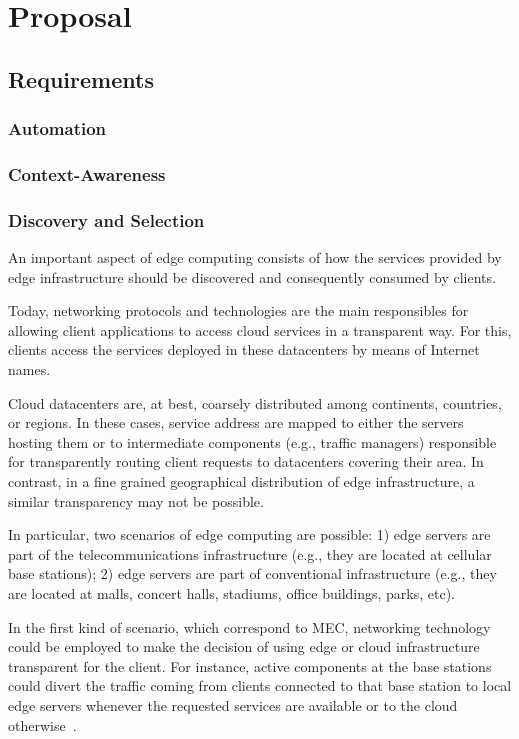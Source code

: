 \section{Proposal}\label{sec:proposal}

\subsection{Requirements}

\subsubsection{Automation}



\subsubsection{Context-Awareness}



\subsubsection{Discovery and Selection }

An important aspect of edge computing consists of how the services provided by edge infrastructure should be discovered and consequently consumed by clients. 

Today, networking protocols and technologies are the main responsibles for allowing client applications to access cloud services in a transparent way. For this, clients access the services deployed in these datacenters by means of Internet names. 

Cloud datacenters are, at best, coarsely distributed among continents, countries, or regions. In these cases, service address are mapped to either the servers hosting them or to intermediate components (e.g., traffic managers) responsible for transparently routing client requests to datacenters covering their area. In contrast, in a fine grained geographical distribution of edge infrastructure, a similar transparency may not be possible. 

In particular, two scenarios of edge computing are possible: 1) edge servers are part of the telecommunications infrastructure (e.g., they are located at cellular base stations); 2) edge servers are part of conventional infrastructure  (e.g., they are located at malls, concert halls, stadiums, office buildings, parks, etc). 

In the first kind of scenario, which correspond to MEC, networking technology could be employed to make the decision of using edge or cloud infrastructure transparent for the client. For instance, active components at the base stations could divert the traffic coming from clients connected to that base station to local edge servers whenever the requested services are available or to the cloud otherwise~\cite{MEC_ROUTING}. 

